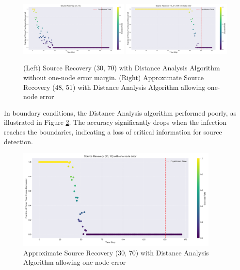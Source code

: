 \begin{figure}[H]
\centering
\includegraphics[width=0.49\textwidth]{Source_Recovery_30_70_Distance_analysis.png}
\includegraphics[width=0.49\textwidth]{Approx_Source_Recovery_48_51_Distance_Analysis.png}
\caption{(Left) Source Recovery (30, 70) with Distance Analysis Algorithm without one-node error margin. (Right) Approximate Source Recovery (48, 51) with Distance Analysis Algorithm allowing one-node error}
\label{Source_recovery_distance_analysis}
\end{figure}

In boundary conditions, the Distance Analysis algorithm performed poorly, as illustrated in Figure \ref{boundary_handling_distance_analysis}. The accuracy significantly drops when the infection reaches the boundaries, indicating a loss of critical information for source detection.

\begin{figure}[H]
\centering
\includegraphics[width=0.9\textwidth]{Approx_Source_Recovery_30_70_Distance_Analysis.png}
\caption{Approximate Source Recovery (30, 70) with Distance Analysis Algorithm allowing one-node error}
\label{boundary_handling_distance_analysis}
\end{figure}

